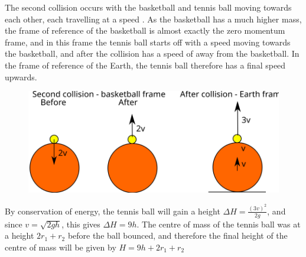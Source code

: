 \begin{problem}[Superball]
{The second collision occurs with the basketball and tennis ball moving towards each other, each travelling at a speed . As the basketball has a much higher mass, the frame of reference of the basketball is almost exactly the zero momentum frame, and in this frame the tennis ball starts off with a speed  moving towards the basketball, and after the collision has a speed of  away from the basketball. In the frame of reference of the Earth, the tennis ball therefore has a final speed  upwards.

\begin{figure}[h]
\centering
\includegraphics[scale =1]{../../../figures/dynamics_tennis_basket_ball_second.svg}
\caption{}
\label{fig:dynamics_tennis_basket_second}
\end{figure}


By conservation of energy, the tennis ball will gain a height $\Delta H = \frac{(3v)^2}{2g}$, and since $v = \sqrt{2gh}$, this gives $\Delta H = 9h$. The centre of mass of the tennis ball was at a height $2r_1 + r_2$ before the ball bounced, and therefore the final height of the centre of mass will be given by $H = 9h + 2r_1 + r_2$
}
\end{problem}